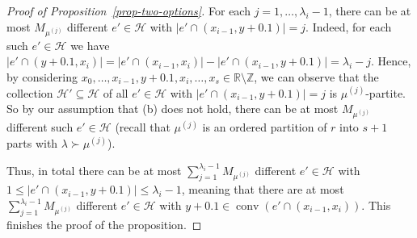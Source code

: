 \documentclass[10pt,a4paper]{amsart}
\theoremstyle{definition}
\newcommand{\su}{\subseteq}
\newcommand{\sm}{\setminus}
\newcommand{\Z}{\mathbb{Z}}
\newcommand{\HH}{\mathcal{H}}
\newcommand{\conv}{\operatorname{conv}}
\begin{document}
\begin{proof}[Proof of Proposition~\ref{prop-two-options}]
For each $j=1,\dots,\lambda_i-1$, there can be at most $M_{\mu^{(j)}}$ different $e'\in\HH$ with $|e'\cap (x_{i-1},y+0.1)|=j$. Indeed, for each such $e'\in\HH$ we have $|e'\cap (y+0.1,x_i)|=|e'\cap (x_{i-1},x_i)|-|e'\cap (x_{i-1},y+0.1)|=\lambda_i-j$. Hence, by considering $x_0,\dots,x_{i-1}, y+0.1,x_i,\dots,x_s\in \mathbb{R}\sm \Z$, we can observe that the collection $\HH'\su \HH$ of all $e'\in\HH$ with $|e'\cap (x_{i-1},y+0.1)|=j$ is $\mu^{(j)}$-partite. So by our assumption that (b) does not hold, there can be at most $M_{\mu^{(j)}}$ different such $e'\in\HH$ (recall that $\mu^{(j)}$ is an ordered partition of $r$ into $s+1$ parts with $\lambda\succ \mu^{(j)}$).

Thus, in total there can be at most $\sum_{j=1}^{\lambda_i-1} M_{\mu^{(j)}}$ different $e'\in\HH$ with $1\le |e'\cap (x_{i-1},y+0.1)|\le \lambda_i-1$, meaning that there are at most $\sum_{j=1}^{\lambda_i-1} M_{\mu^{(j)}}$ different $e'\in\HH$ with $y+0.1\in \conv(e'\cap (x_{i-1},x_i))$. This finishes the proof of the proposition.
\end{proof}
\end{document}

